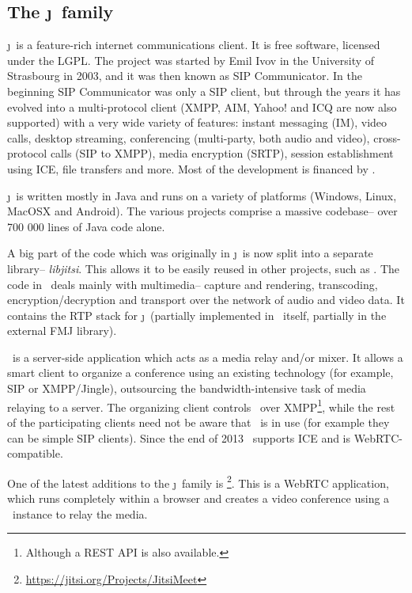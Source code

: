 \documentclass[twoside,openright,a4paper,12pt,english]{article}
\begin{document}
\subsection{The \j\ family}
\label{intro-jitsi}

\j\ is a feature-rich internet communications client.
It is free software, licensed under the LGPL\cite{lgpl}.
The project was started by Emil Ivov in
the University of Strasbourg in 2003, and it was then known as SIP
Communicator. In the beginning
SIP Communicator was only a SIP client, but through the years it has evolved
into a multi-protocol
client (XMPP, AIM, Yahoo! and ICQ are now also supported) with a very wide variety
of features: instant messaging (IM), video calls, desktop streaming,
conferencing (multi-party, both audio and video), cross-protocol calls (SIP to
XMPP), media encryption (SRTP),
session establishment using ICE, file transfers and more.
Most of the development is financed by \bj.

\j\ is written mostly in Java and runs on a variety of
platforms (Windows, Linux, MacOSX and Android). The various projects comprise a massive codebase--
over 700 000 lines of Java code alone.

A big part of the code which was originally in \j\ is now split into a
separate library-- \emph{libjitsi}. This allows it to be easily reused in other
projects, such as \jvb. The code in \lj\ deals mainly with multimedia-- capture
and rendering, transcoding, encryption/decryption and transport over the
network of audio and video data. It contains the RTP stack for \j\ (partially
implemented in \lj\ itself, partially in the external FMJ library).

\jvb\ is a server-side application which acts as a media
relay and/or mixer. It allows a smart client to organize a conference
using an existing technology (for example, SIP or XMPP/Jingle), outsourcing the bandwidth-intensive task of media relaying to a server. 
The organizing client controls \jvb\ over XMPP\footnote{Although a REST API is also available.}, while the rest of the
participating clients need not be aware that \jvb\ is in use (for example they
can be simple SIP clients). Since the end of 2013 \jvb\ supports ICE and is WebRTC-compatible.

One of the latest additions to the \j\ family is
\jm\footnote{\url{https://jitsi.org/Projects/JitsiMeet}}. This is a WebRTC
application, which runs completely within a browser and creates a video
conference using a \jvb\ instance to relay the media.
\end{document}
